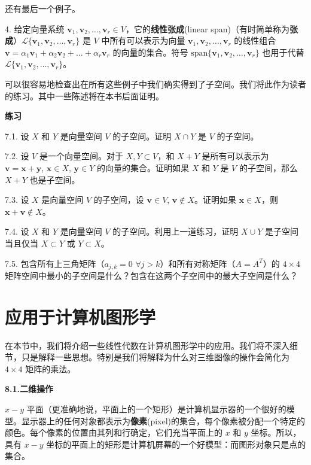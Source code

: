 还有最后一个例子。

4. 给定向量系统 $\mathbf{v}_1, \mathbf{v}_2, \dots, \mathbf{v}_r \in V$，它的\textbf{线性张成}(linear span)（有时简单称为\textbf{张成}）$\mathcal{L}\{\mathbf{v}_1, \mathbf{v}_2, \dots, \mathbf{v}_r\}$ 是 $V$ 中所有可以表示为向量 $\mathbf{v}_1, \mathbf{v}_2, \dots, \mathbf{v}_r$ 的线性组合 $\mathbf{v} = \alpha_1 \mathbf{v}_1 + \alpha_2 \mathbf{v}_2 + \dots + \alpha_r \mathbf{v}_r$ 的向量的集合。符号 $\text{span}\{\mathbf{v}_1, \mathbf{v}_2, \dots, \mathbf{v}_r\}$ 也用于代替 $\mathcal{L}\{\mathbf{v}_1, \mathbf{v}_2, \dots, \mathbf{v}_r\}$。

可以很容易地检查出在所有这些例子中我们确实得到了子空间。我们将此作为读者的练习。其中一些陈述将在本书后面证明。


\textbf{练习}~

7.1. 设 $X$ 和 $Y$ 是向量空间 $V$ 的子空间。证明 $X \cap Y$ 是 $V$ 的子空间。

7.2. 设 $V$ 是一个向量空间。对于 $X, Y \subset V$，和 $X+Y$ 是所有可以表示为 $\mathbf{v} = \mathbf{x} + \mathbf{y}$, $\mathbf{x} \in X$, $\mathbf{y} \in Y$ 的向量的集合。证明如果 $X$ 和 $Y$ 是 $V$ 的子空间，那么 $X+Y$ 也是子空间。

7.3. 设 $X$ 是向量空间 $V$ 的子空间，设 $\mathbf{v} \in V$, $\mathbf{v} \notin X$。证明如果 $\mathbf{x} \in X$，则 $\mathbf{x} + \mathbf{v} \notin X$。

7.4. 设 $X$ 和 $Y$ 是向量空间 $V$ 的子空间。利用上一道练习，证明 $X \cup Y$ 是子空间当且仅当 $X \subset Y$ 或 $Y \subset X$。

7.5. 包含所有上三角矩阵（$a_{j,k} = 0$ $\forall j > k$）和所有对称矩阵（$A = A^T$）的 $4 \times 4$ 矩阵空间中最小的子空间是什么？包含在这两个子空间中的最大子空间是什么？


\section{应用于计算机图形学}

在本节中，我们将介绍一些线性代数在计算机图形学中的应用。我们将不深入细节，只是解释一些思想。特别是我们将解释为什么对三维图像的操作会简化为 $4 \times 4$ 矩阵的乘法。

\textbf{8.1.二维操作}

$x-y$ 平面（更准确地说，平面上的一个矩形）是计算机显示器的一个很好的模型。显示器上的任何对象都表示为\textbf{像素}(pixel)的集合，每个像素被分配一个特定的颜色。每个像素的位置由其列和行确定，它们充当平面上的 $x$ 和 $y$ 坐标。所以，具有 $x-y$ 坐标的平面上的矩形是计算机屏幕的一个好模型：而图形对象只是点的集合。

